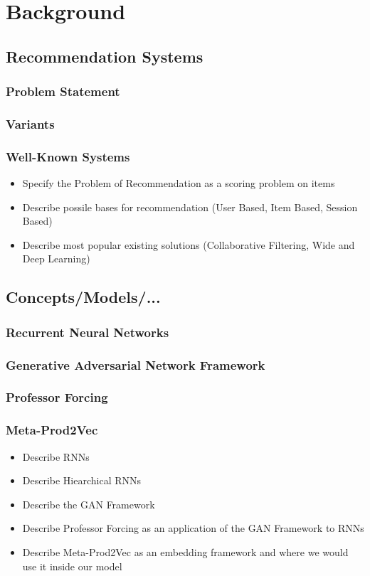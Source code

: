 \chapter{Background}

\section{Recommendation Systems}
\subsection{Problem Statement}
\subsection{Variants}
\subsection{Well-Known Systems}
\begin{itemize}
\item Specify the Problem of Recommendation as a scoring problem on items
\item Describe possile bases for recommendation (User Based, Item Based, Session Based)
\item Describe most popular existing solutions (Collaborative Filtering, Wide and Deep Learning)
\end{itemize}

\section{Concepts/Models/...}
\subsection{Recurrent Neural Networks}
\subsection{Generative Adversarial Network Framework}
\subsection{Professor Forcing}
\subsection{Meta-Prod2Vec}
\begin{itemize}
\item Describe RNNs
\item Describe Hiearchical RNNs
\item Describe the GAN Framework
\item Describe Professor Forcing as an application of the GAN Framework to RNNs
\item Describe Meta-Prod2Vec as an embedding framework and where we would use it inside our model
\end{itemize}

